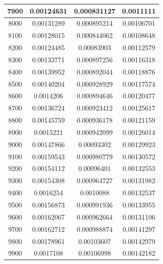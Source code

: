 \documentclass[11pt,spanish]{article} %
\begin{document}
\begin{center}
\begin{longtable}{|c|c|c|c|}
7900 & 0.00124631  & 0.000831127 & 0.0011111   \\ \hline
8000 & 0.00131289  & 0.000895214 & 0.00106701  \\ \hline
8100 & 0.00128015  & 0.000844062 & 0.00108648  \\ \hline
8200 & 0.00124485  & 0.00083903  & 0.00112579  \\ \hline
8300 & 0.00133771  & 0.000897256 & 0.00116318  \\ \hline
8400 & 0.00139952  & 0.000892044 & 0.00118876  \\ \hline
8500 & 0.00140204  & 0.000928929 & 0.00117574  \\ \hline
8600 & 0.0014206   & 0.000894646 & 0.00120477  \\ \hline
8700 & 0.00136724  & 0.000923412 & 0.00125617  \\ \hline
8800 & 0.00145759  & 0.000936178 & 0.00121159  \\ \hline
8900 & 0.0015221   & 0.000942099 & 0.00126014  \\ \hline
9000 & 0.00147866  & 0.00093302  & 0.00129923  \\ \hline
9100 & 0.00159543  & 0.000980779 & 0.00130572  \\ \hline
9200 & 0.00154112  & 0.00096401  & 0.00132553  \\ \hline
9300 & 0.00154308  & 0.000964727 & 0.00131982  \\ \hline
9400 & 0.0016254   & 0.0010088   & 0.00132537  \\ \hline
9500 & 0.00156873  & 0.000991936 & 0.00133955  \\ \hline
9600 & 0.00162067  & 0.000962664 & 0.00131106  \\ \hline
9700 & 0.00162712  & 0.000988874 & 0.00141297  \\ \hline
9800 & 0.00178961  & 0.00103607  & 0.00142979  \\ \hline
9900 & 0.0017108   & 0.00106998  & 0.00142182  \\ \hline
\end{longtable}
\end{center}
\end{document}
